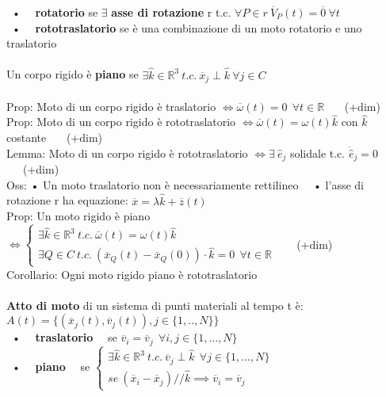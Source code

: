 \documentclass{article}
\begin{document}
\ • \ \ \textbf{rotatorio} se $\exists$ \textbf{asse di rotazione} r t.c. $\forall P \in r \ \overline{V}_P(t) = \overline{0} \ \forall t$ \\
\ • \ \ \textbf{rototraslatorio} se è una combinazione di un moto rotatorio e uno traslatorio \\ \\
%
%
%
Un corpo rigido è \textbf{piano} se $\exists \hat{k} \in \mathbb{R}^3 \ t.c. \ \overline{x}_j \perp \hat{k} \ \forall j \in C$ \\ \\
%
%
%
Prop: Moto di un corpo rigido è traslatorio $\Longleftrightarrow \overline{\omega}(t) =0 \ \ \forall t \in \mathbb{R}$ \ \ \ (+dim) \\
Prop: Moto di un corpo rigido è rototraslatorio $\Longleftrightarrow \overline{\omega}(t) = \omega(t)\hat{k}$ con $\hat{k}$ costante \ \ \ (+dim) \\
Lemma: Moto di un corpo rigido è rototraslatorio $\Longleftrightarrow \exists \ \hat{e}_j$ solidale t.c. $\dot{\hat{e}}_j=0$ \ \ \ (+dim) \\
Oss: • Un moto traslatorio non è necessariamente rettilineo \ \ • l'asse di rotazione r ha equazione: $\overline{x}=\lambda\hat{k} + \overline{z}(t)$ \\
Prop: Un moto rigido è piano $\Longleftrightarrow \begin{cases}
\exists \hat{k} \in \mathbb{R}^3 \ t.c. \ \overline{\omega}(t)= \omega(t)\hat{k} \\
\exists Q \in C \ t.c. \ (\overline{x}_Q(t)-\overline{
x}_Q(0))\cdot \hat{k} = 0 \ \ \forall t \in \mathbb{R} \end{cases}$ \ \ \ (+dim) \\ 
Corollario: Ogni moto rigido piano è rototraslatorio \\ \\
%
%
%
\textbf{Atto di moto} di un sistema di punti materiali al tempo t è: $A(t)=\{ (\overline{x}_j(t),\overline{v}_j(t)), j\in\{1,..,N\} \}$ \\
\ • \ \ \textbf{traslatorio} \ \ se $\overline{v}_i=\overline{v}_j \ \ \forall i,j \in \{1,...,N\}$ \\
\ • \ \ \textbf{piano} \ \ se $\begin{cases}
\exists \hat{k} \in \mathbb{R}^3 \ t.c. \ \overline{v}_j \perp \hat{k} \ \ \forall j \in \{1,...,N\} \\
se \ (\overline{x}_i -\overline{x}_j) /\!\!/ \hat{k} \implies \overline{v}_i = \overline{v}_j \end{cases}$ \\
\end{document}
